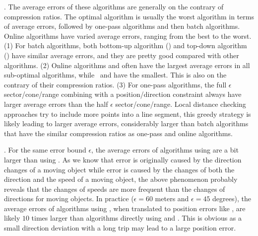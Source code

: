 {. The average errors of these algorithms  are generally on the contrary of compression ratios. The optimal algorithm is usually  the worst algorithm in terms of average errors, followed by one-pass algorithms and then batch algorithms.
Online algorithms have varied average errors, ranging from the best to the worst.
(1) For batch algorithms, both bottom-up algorithm (\tpa) and top-down algorithm (\dpa) have similar average errors, and they are pretty good compared with other algorithms.
%
(2) Online algorithms \bqsa and \opwa often have the largest average errors in all sub-optimal algorithms, while {\dagots}~and \squishe have the smallest. This is also on the contrary of their compression ratios.
%
(3) For one-pass algorithms, the full $\epsilon$ sector/cone/range combining with a position/direction constraint always have larger average errors than the half $\epsilon$ sector/cone/range.
%
Local distance checking approaches try to include more points into a line segment, this greedy strategy is likely leading to larger average errors, considerably larger than batch algorithms that have the similar compression ratios as one-pass and online algorithms.


.
For the same error bound $\epsilon$, the average errors of algorithms using \sed are a bit larger than using \ped. {As we know that \ped error is originally caused by the direction changes of a moving object while \sed error is caused by the changes of both the direction and the speed of a moving object, the above phenomenon probably reveals that the changes of speeds are more frequent than the changes of directions for moving objects.}
%
In practice (\eg $\epsilon = 60$ meters and $\epsilon = 45$ degrees), the average errors of algorithms using \dad, when translated to position errors like \ped, are likely $10$ times larger than algorithms directly using \ped and \sed. This is obvious as a small direction deviation with a long trip may lead to a large position error.










}

